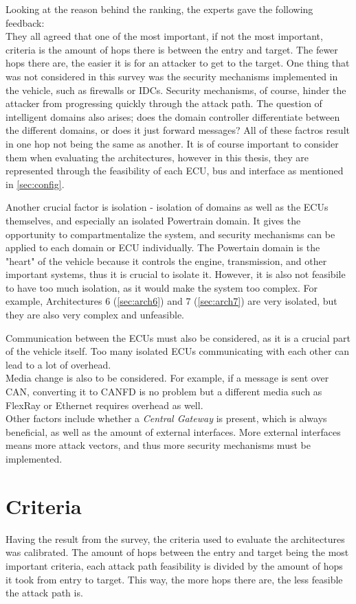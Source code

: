 Looking at the reason behind the ranking, the experts gave the following feedback:\\

They all agreed that one of the most important, if not the most important, criteria is the amount of hops there is between the entry and target.
The fewer hops there are, the easier it is for an attacker to get to the target.
One thing that was not considered in this survey was the security mechanisms implemented in the vehicle, such as firewalls or IDCs.
Security mechanisms, of course, hinder the attacker from progressing quickly through the attack path.
The question of intelligent domains also arises; does the domain controller differentiate between the different domains, or does it just forward messages?
All of these factros result in one hop not being the same as another.
It is of course important to consider them when evaluating the architectures, however in this thesis, 
they are represented through the feasibility of each ECU, bus and interface as mentioned in \ref{sec:config}.

Another crucial factor is isolation - isolation of domains as well as the ECUs themselves, and especially an isolated Powertrain domain.
It gives the opportunity to compartmentalize the system, and security mechanisms can be applied to each domain or ECU individually.
The Powertain domain is the "heart" of the vehicle because it controls the engine, transmission, and other important systems, thus it is crucial to isolate it.
However, it is also not feasibile to have too much isolation, as it would make the system too complex.
For example, Architectures 6 (\ref{sec:arch6}) and 7 (\ref{sec:arch7}) are very isolated, but they are also very complex and unfeasible.

Communication between the ECUs must also be considered, as it is a crucial part of the vehicle itself. 
Too many isolated ECUs communicating with each other can lead to a lot of overhead.\\
Media change is also to be considered. 
For example, if a message is sent over CAN, converting it to CANFD is no problem but a different media such as FlexRay or Ethernet requires overhead as well.\\

Other factors include whether a \textit{Central Gateway} is present, which is always beneficial, as well as the amount of external interfaces.
More external interfaces means more attack vectors, and thus more security mechanisms must be implemented.\\


\section{Criteria}

Having the result from the survey, the criteria used to evaluate the architectures was calibrated.
The amount of hops between the entry and target being the most important criteria, each attack path feasibility is divided by the amount of hops it took from entry to target.
This way, the more hops there are, the less feasible the attack path is.